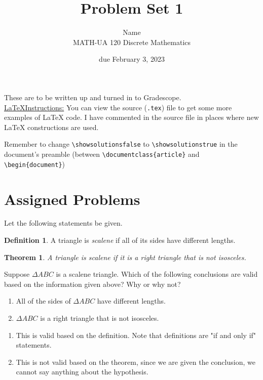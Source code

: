 \documentclass{article}
\title{Problem Set 1}
\author{%
    Name
\\  MATH-UA 120 Discrete Mathematics
}
\date{due February 3, 2023}
\newif\ifshowsolutions
\newcommand{\danger}{\marginpar[\hfill\dbend]{\dbend\hfill}}
\newtheorem*{theorem}{Theorem}
\theoremstyle{definition}
\newtheorem*{definition}{Definition}
\begin{document}
\maketitle



These are to be written up and turned in to Gradescope.\\



\ifshowsolutions
    \SetupExSheets{solution/print=true}
\else
    \danger
 \underline{ \LaTeX  Instructions:}  You can view the source (\texttt{.tex}) file to get some more examples of \LaTeX{} code.  I have commented in the source file in places where new \LaTeX{} constructions are used.
  
  Remember to change \verb|\showsolutionsfalse| to \verb|\showsolutionstrue|
    in the document's preamble 
    (between \verb|\documentclass{article}| and \verb|\begin{document}|)
\fi

\section*{Assigned Problems}


\begin{question}
    Let the following statements be given. 
       \begin{definition}
          A triangle is \emph{scalene} if all of its sides have different lengths.
       \end{definition}
       \begin{theorem}
          A triangle is scalene if it is a right triangle that is not isosceles.
       \end{theorem}
    Suppose $\Delta ABC$ is a scalene triangle. 
    Which of the following conclusions are valid based on the information given above? 
    Why or why not?
    \begin{enumerate}
        \item All of the sides of $\Delta ABC$ have different lengths.
        \item $\Delta ABC$ is a right triangle that is not isosceles.
    \end{enumerate}
\end{question}
\begin{solution}
    \begin{enumerate}
        \item This is valid based on the definition. Note that definitions are "if and only if" statements.
        \item This is not valid based on the theorem, since we are given the conclusion, 
            we cannot say anything about the hypothesis.
    \end{enumerate}
\end{solution}
\end{document}

